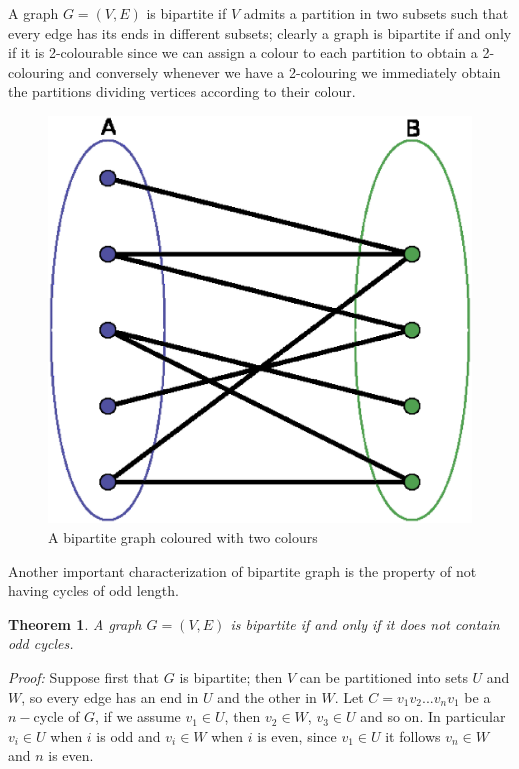 \documentclass[a4paper,12pt,twoside]{book}
\newtheorem{theorem}{Theorem}[chapter]
\begin{document}
A graph $G=(V,E)$ is bipartite if $V$ admits a partition in two subsets such that every edge has its ends in different subsets; clearly a graph is bipartite if and only if it is 2-colourable since we can assign a colour to each partition to obtain a 2-colouring and conversely whenever we have a 2-colouring we immediately obtain the partitions dividing vertices according to their colour. 
\begin{figure} 
\begin{center}
\includegraphics[scale=0.3]{bipartite.eps}
\caption{A bipartite graph coloured with two colours}\label{bip}
\end{center}
\end{figure}

Another important characterization of bipartite graph is the property of not having cycles of odd length.
\begin{theorem}
A graph $G=(V,E)$ is bipartite if and only if it does not contain odd cycles.
\end{theorem}
\textit{Proof:}
Suppose first that $G$ is bipartite; then $V$ can be partitioned into sets $U$ and $W$, so every edge has an end in $U$ and the other in $W$. Let $C=v_1v_2...v_nv_1$ be a $n-$cycle of $G$, if we assume $v_1\in U$, then $v_2\in W$, $v_3\in U$ and so on.
In particular $v_i\in U $ when $i$ is odd and $v_i\in W$ when $i$ is even, since $v_1\in U$ it follows $v_n\in W$ and $n$ is even.
\end{document}
